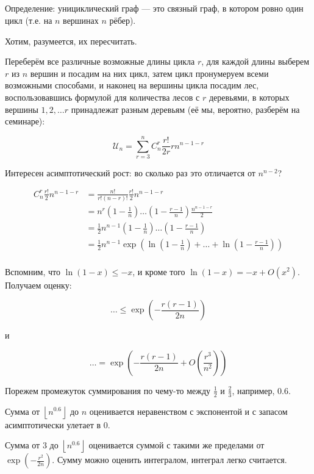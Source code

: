 \documentclass[12pt]{article}
\begin{document}
\subsection{}

Определение: унициклический граф — это связный граф, в котором ровно один цикл (т.е. на $n$ вершинах $n$ рёбер).

Хотим, разумеется, их пересчитать.

Переберём все различные возможные длины цикла $r$, для каждой длины выберем $r$ из $n$ вершин и посадим на них цикл, затем цикл пронумеруем всеми возможными способами, и наконец на вершины цикла посадим лес, воспользовавшись формулой для количества лесов с $r$ деревьями, в которых вершины $1, 2, \ldots r$ принадлежат разным деревьям (её мы, вероятно, разберём на семинаре):

\[
\mathcal{U}_n = \sum_{r = 3}^n C^r_n \frac {r!} {2 r} r n^{n - 1 - r}
\]

Интересен асимптотический рост: во сколько раз это отличается от $n^{n - 2}$?

\begin{align*}
C^r_n \frac {r!} 2 n^{n - 1 - r} &= \frac {n!} {r!(n-r)!} \frac {r!} 2 n^{n-1-r} \\
&= n^r \left(1 - \frac 1 n \right) \ldots \left(1 - \frac {r - 1} n \right) \frac {n^{n - 1 - r}} 2 \\
&= \frac 1 2 n^{n - 1} \left(1 - \frac 1 n\right) \ldots \left(1 - \frac {r - 1} n\right) \\
&= \frac 1 2 n^{n - 1} \exp\left(\ln\left(1 - \frac 1 n\right) + \ldots + \ln\left(1 - \frac {r - 1} n\right)\right) \\
\end{align*}

Вспомним, что $\ln(1 - x) \leq -x$, и кроме того $\ln(1 - x) = -x + O(x^2)$. Получаем оценку:

\[
\ldots \leq \exp \left( -\frac {r(r-1)} {2n} \right)
\]

и

\[
\ldots = \exp \left( -\frac {r(r-1)} {2n} + O \left(\frac {r^3} {n^2} \right) \right)
\]

Порежем промежуток суммирования по чему-то между $\frac 1 2$ и $\frac 2 3$, например, $0.6$.

Сумма от $\left\lfloor n^{0.6} \right\rfloor$ до $n$ оценивается неравенством с экспонентой и с запасом асимптотически улетает в 0.

Сумма от $3$ до $\left\lfloor n^{0.6} \right\rfloor$ оценивается суммой с такими же пределами от $\exp \left( -\frac {r^2} {2n} \right)$. Сумму можно оценить интегралом, интеграл легко считается.
\end{document}
